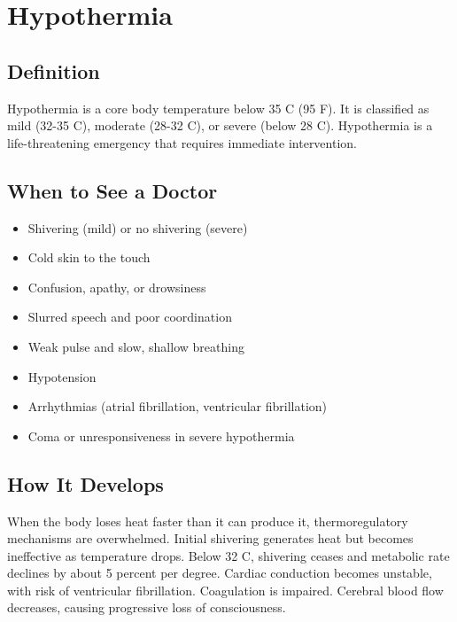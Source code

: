 \chapter{Hypothermia}

\section*{Definition}
Hypothermia is a core body temperature below 35 C (95 F). It is classified as mild (32-35 C), moderate (28-32 C), or severe (below 28 C). Hypothermia is a life-threatening emergency that requires immediate intervention.

\section*{When to See a Doctor}
\begin{itemize}
\item Shivering (mild) or no shivering (severe)
\item Cold skin to the touch
\item Confusion, apathy, or drowsiness
\item Slurred speech and poor coordination
\item Weak pulse and slow, shallow breathing
\item Hypotension
\item Arrhythmias (atrial fibrillation, ventricular fibrillation)
\item Coma or unresponsiveness in severe hypothermia
\end{itemize}

\section*{How It Develops}
When the body loses heat faster than it can produce it, thermoregulatory mechanisms are overwhelmed. Initial shivering generates heat but becomes ineffective as temperature drops. Below 32 C, shivering ceases and metabolic rate declines by about 5 percent per degree. Cardiac conduction becomes unstable, with risk of ventricular fibrillation. Coagulation is impaired. Cerebral blood flow decreases, causing progressive loss of consciousness.


